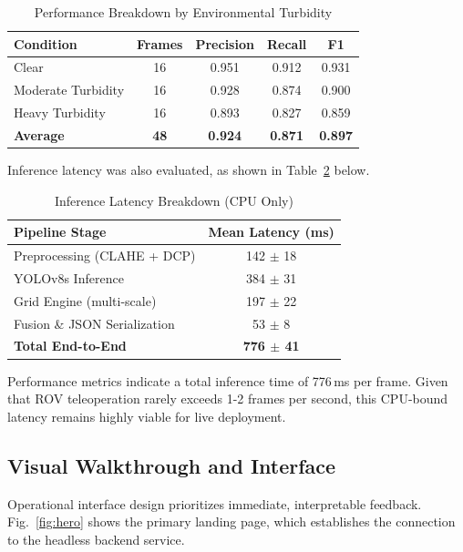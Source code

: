 \documentclass[conference]{IEEEtran}
\begin{document}
\begin{table}[htbp]
\caption{Performance Breakdown by Environmental Turbidity}
\begin{center}
\begin{tabular}{lcccc}
\toprule
\textbf{Condition} & \textbf{Frames} & \textbf{Precision} & \textbf{Recall} & \textbf{F1} \\
\midrule
Clear & 16 & 0.951 & 0.912 & 0.931 \\
Moderate Turbidity & 16 & 0.928 & 0.874 & 0.900 \\
Heavy Turbidity & 16 & 0.893 & 0.827 & 0.859 \\
\midrule
\textbf{Average} & \textbf{48} & \textbf{0.924} & \textbf{0.871} & \textbf{0.897} \\
\bottomrule
\end{tabular}
\label{tab:turbidity}
\end{center}
\end{table}

Inference latency was also evaluated, as shown in Table~\ref{tab:latency} below.

\begin{table}[htbp]
\caption{Inference Latency Breakdown (CPU Only)}
\begin{center}
\begin{tabular}{lc}
\toprule
\textbf{Pipeline Stage} & \textbf{Mean Latency (ms)} \\
\midrule
Preprocessing (CLAHE + DCP)   & 142 $\pm$ 18 \\
YOLOv8s Inference             & 384 $\pm$ 31 \\
Grid Engine (multi-scale)     & 197 $\pm$ 22 \\
Fusion \& JSON Serialization  & 53 $\pm$ 8  \\
\midrule
\textbf{Total End-to-End}     & \textbf{776 $\pm$ 41} \\
\bottomrule
\end{tabular}
\label{tab:latency}
\end{center}
\end{table}

Performance metrics indicate a total inference time of 776\,ms per frame. Given that ROV teleoperation rarely exceeds 1-2 frames per second, this CPU-bound latency remains highly viable for live deployment.

\subsection{Visual Walkthrough and Interface}
Operational interface design prioritizes immediate, interpretable feedback. Fig.~\ref{fig:hero} shows the primary landing page, which establishes the connection to the headless backend service.
\end{document}
